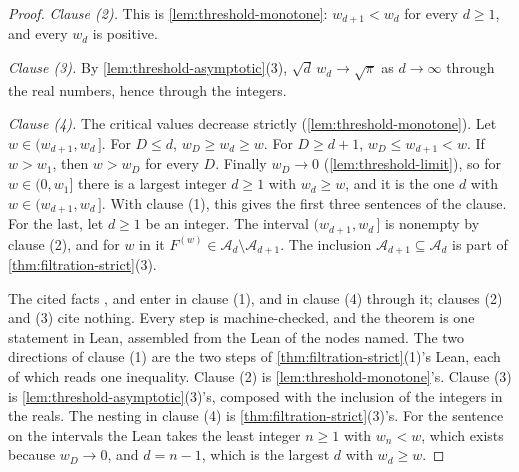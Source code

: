 \begin{proof}
\emph{Clause (2).} This is \ref{lem:threshold-monotone}: $w_{d+1} < w_d$ for every $d \ge 1$,
and every $w_d$ is positive.

\emph{Clause (3).} By \ref{lem:threshold-asymptotic}(3), $\sqrt d\,w_d \to \sqrt\pi$ as
$d \to \infty$ through the real numbers, hence through the integers.

\emph{Clause (4).} The critical values decrease strictly
(\ref{lem:threshold-monotone}). Let $w \in (w_{d+1}, w_d\,]$. For $D \le d$,
$w_D \ge w_d \ge w$. For $D \ge d + 1$, $w_D \le w_{d+1} < w$. If $w > w_1$, then $w > w_D$ for
every $D$. Finally $w_D \to 0$ (\ref{lem:threshold-limit}), so for $w \in (0,w_1]$ there is a
largest integer $d \ge 1$ with $w_d \ge w$, and it is the one $d$ with
$w \in (w_{d+1}, w_d\,]$.
With clause (1), this gives the first three sentences of the clause. For the last, let $d \ge 1$
be an integer. The interval $(w_{d+1}, w_d\,]$ is nonempty by clause (2), and for $w$ in it
$F^{(w)} \in \mathcal{A}_d \setminus \mathcal{A}_{d+1}$. The inclusion
$\mathcal{A}_{d+1} \subseteq \mathcal{A}_d$ is part of \ref{thm:filtration-strict}(3).

The cited facts ,  and  enter in clause (1), and in clause (4)
through it; clauses (2) and (3) cite nothing. Every step is machine-checked, and the theorem is
one statement in Lean, assembled from the Lean of the nodes named. The two directions of clause
(1) are the two steps of \ref{thm:filtration-strict}(1)'s Lean, each of which reads one
inequality. Clause (2) is \ref{lem:threshold-monotone}'s. Clause (3) is
\ref{lem:threshold-asymptotic}(3)'s, composed with the inclusion of the integers in the reals.
The nesting in clause (4) is \ref{thm:filtration-strict}(3)'s. For the sentence on the intervals
the Lean takes the least integer $n \ge 1$ with $w_n < w$, which exists because $w_D \to 0$, and
$d = n - 1$, which is the largest $d$ with $w_d \ge w$.
\end{proof}

